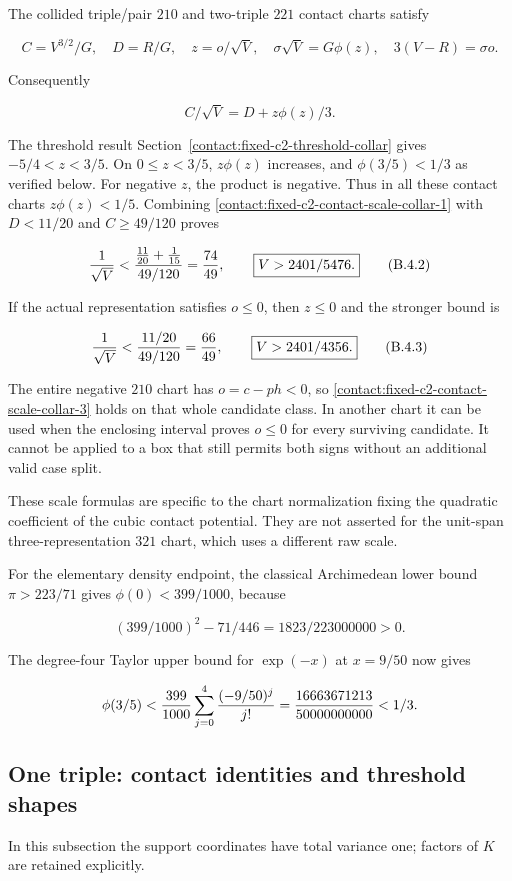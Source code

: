 The collided triple/pair $210$ and two-triple $221$ contact charts satisfy

\[
 C=V^{3/2}/G,\quad D=R/G,\quad z=o/\sqrt V,
 \quad\sigma\sqrt V=G\phi(z),
 \quad3(V-R)=\sigma o.
\]

Consequently

\[
 \boxed{C/\sqrt V=D+z\phi(z)/3.}
\tag{B.4.1}\label{contact:fixed-c2-contact-scale-collar-1}
\]

The threshold result
Section~\ref{contact:fixed-c2-threshold-collar} gives
$-5/4<z<3/5$. On $0\le z<3/5$, $z \phi(z)$ increases, and
$\phi(3/5)<1/3$ as verified below. For negative $z$, the product is negative.
Thus in all these contact charts $z \phi(z)<1/5$. Combining \eqref{contact:fixed-c2-contact-scale-collar-1} with
$D<11/20$ and $C\ge49/120$ proves

\[
 {1\over\sqrt V}<{{11\over20}+{1\over15}\over49/120}
 ={74\over49},\qquad
 \boxed{V>2401/5476.}
\tag{B.4.2}\label{contact:fixed-c2-contact-scale-collar-2}
\]

If the actual representation satisfies $o\le 0$, then $z\le 0$ and the stronger bound is

\[
 {1\over\sqrt V}<{11/20\over49/120}={66\over49},\qquad
 \boxed{V>2401/4356.}
\tag{B.4.3}\label{contact:fixed-c2-contact-scale-collar-3}
\]

The entire negative $210$ chart has $o=c-ph<0$, so \eqref{contact:fixed-c2-contact-scale-collar-3} holds on that whole
candidate class. In another chart it can be used when the enclosing interval proves $o\le 0$ for every surviving candidate. It cannot
be applied to a box that still permits both signs without an additional
valid case split.

These scale formulas are specific to the chart normalization fixing the
quadratic coefficient of the cubic contact potential. They are not asserted
for the unit-span three-representation $321$ chart, which uses a different raw scale.

For the elementary density endpoint, the classical Archimedean lower bound
$\pi>223/71$ gives $\phi(0)<399/1000$, because

\[
 (399/1000)^2-71/446=1823/223000000>0.
\]

The degree-four Taylor upper bound for $\exp(-x)$ at $x=9/50$ now gives

\[
 \phi(3/5)<{399\over1000}\sum_{j=0}^4{(-9/50)^j\over j!}
 ={16663671213\over50000000000}<1/3.
\]
\subsection{One triple: contact identities and threshold shapes}\label{contact:one-triple-bernoulli-contacts}
In this subsection the support coordinates have total variance one; factors of $K$ are retained explicitly.



